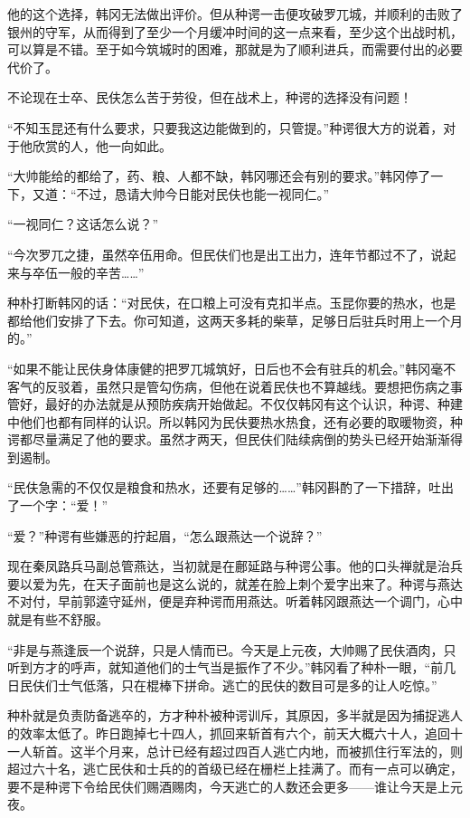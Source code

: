 他的这个选择，韩冈无法做出评价。但从种谔一击便攻破罗兀城，并顺利的击败了银州的守军，从而得到了至少一个月缓冲时间的这一点来看，至少这个出战时机，可以算是不错。至于如今筑城时的困难，那就是为了顺利进兵，而需要付出的必要代价了。

不论现在士卒、民伕怎么苦于劳役，但在战术上，种谔的选择没有问题！

“不知玉昆还有什么要求，只要我这边能做到的，只管提。”种谔很大方的说着，对于他欣赏的人，他一向如此。

“大帅能给的都给了，药、粮、人都不缺，韩冈哪还会有别的要求。”韩冈停了一下，又道：“不过，恳请大帅今日能对民伕也能一视同仁。”

“一视同仁？这话怎么说？”

“今次罗兀之捷，虽然卒伍用命。但民伕们也是出工出力，连年节都过不了，说起来与卒伍一般的辛苦……”

种朴打断韩冈的话：“对民伕，在口粮上可没有克扣半点。玉昆你要的热水，也是都给他们安排了下去。你可知道，这两天多耗的柴草，足够日后驻兵时用上一个月的。”

“如果不能让民伕身体康健的把罗兀城筑好，日后也不会有驻兵的机会。”韩冈毫不客气的反驳着，虽然只是管勾伤病，但他在说着民伕也不算越线。要想把伤病之事管好，最好的办法就是从预防疾病开始做起。不仅仅韩冈有这个认识，种谔、种建中他们也都有同样的认识。所以韩冈为民伕要热水热食，还有必要的取暖物资，种谔都尽量满足了他的要求。虽然才两天，但民伕们陆续病倒的势头已经开始渐渐得到遏制。

“民伕急需的不仅仅是粮食和热水，还要有足够的……”韩冈斟酌了一下措辞，吐出了一个字：“爱！”

“爱？”种谔有些嫌恶的拧起眉，“怎么跟燕达一个说辞？”

现在秦凤路兵马副总管燕达，当初就是在鄜延路与种谔公事。他的口头禅就是治兵要以爱为先，在天子面前也是这么说的，就差在脸上刺个爱字出来了。种谔与燕达不对付，早前郭逵守延州，便是弃种谔而用燕达。听着韩冈跟燕达一个调门，心中就是有些不舒服。

“非是与燕逢辰一个说辞，只是人情而已。今天是上元夜，大帅赐了民伕酒肉，只听到方才的呼声，就知道他们的士气当是振作了不少。”韩冈看了种朴一眼，“前几日民伕们士气低落，只在棍棒下拼命。逃亡的民伕的数目可是多的让人吃惊。”

种朴就是负责防备逃卒的，方才种朴被种谔训斥，其原因，多半就是因为捕捉逃人的效率太低了。昨日跑掉七十四人，抓回来斩首有六个，前天大概六十人，追回十一人斩首。这半个月来，总计已经有超过四百人逃亡内地，而被抓住行军法的，则超过六十名，逃亡民伕和士兵的的首级已经在栅栏上挂满了。而有一点可以确定，要不是种谔下令给民伕们赐酒赐肉，今天逃亡的人数还会更多——谁让今天是上元夜。

